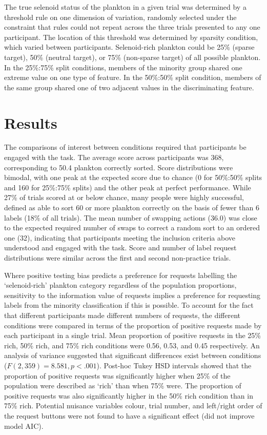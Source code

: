 \documentclass[10pt,letterpaper]{article}
\begin{document}
The true selenoid status of the plankton in a given trial was determined by a threshold rule on one dimension of variation, randomly selected under the constraint that rules could not repeat across the three trials presented to any one participant. The location of this threshold was determined by sparsity condition, which varied between participants. Selenoid-rich plankton could be 25\% (sparse target), 50\% (neutral target), or 75\% (non-sparse target) of all possible plankton. In the 25\%:75\% split conditions, members of the minority group shared one extreme value on one type of feature. In the 50\%:50\% split condition, members of the same group shared one of two adjacent values in the discriminating feature.

\section{Results}
The comparisons of interest between conditions required that participants be engaged with the task. The average score across participants was 368, corresponding to 50.4 plankton correctly sorted. Score distributions were bimodal, with one peak at the expected score due to chance (0 for 50\%:50\% splits and 160 for 25\%:75\% splits) and the other peak at perfect performance. While 27\% of trials scored at or below chance, many people were highly successful, defined as able to sort 60 or more plankton correctly on the basis of fewer than 6 labels (18\% of all trials). The mean number of swapping actions (36.0) was close to the expected required number of swaps to correct a random sort to an ordered one (32), indicating that participants meeting the inclusion criteria above understood and engaged with the task. Score and number of label request distributions were similar across the first and second non-practice trials.

Where positive testing bias predicts a preference for requests labelling the `selenoid-rich' plankton category regardless of the population proportions, sensitivity to the information value of requests implies a preference for requesting labels from the minority classification if this is possible. To account for the fact that different participants made different numbers of requests, the different conditions were compared in terms of the proportion of positive requests made by each participant in a single trial.
Mean proportion of positive requests in the 25\% rich, 50\% rich, and 75\% rich conditions were 0.56, 0.53, and 0.45 respectively. An analysis of variance suggested that significant differences exist between conditions ($F(2,359)=8.581, p<.001$). Post-hoc Tukey HSD intervals showed that the proportion of positive requests was significantly higher when 25\% of the population were described as `rich' than when 75\% were. The proportion of positive requests was also significantly higher in the 50\% rich condition than in 75\% rich. Potential nuisance variables colour, trial number, and left/right order of the request buttons were not found to have a significant effect (did not improve model AIC).
\end{document}
